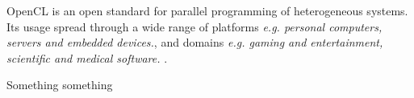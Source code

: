 \par{OpenCL is an open standard for parallel programming of heterogeneous systems. Its usage spread through a wide range of platforms 
    \emph{e.g. personal computers, servers and embedded devices.}, and domains \emph{e.g. gaming and entertainment, 
    scientific and medical software.} \cite{khronos}.}

\par{Something something \cite{nvidia_opencl}}


